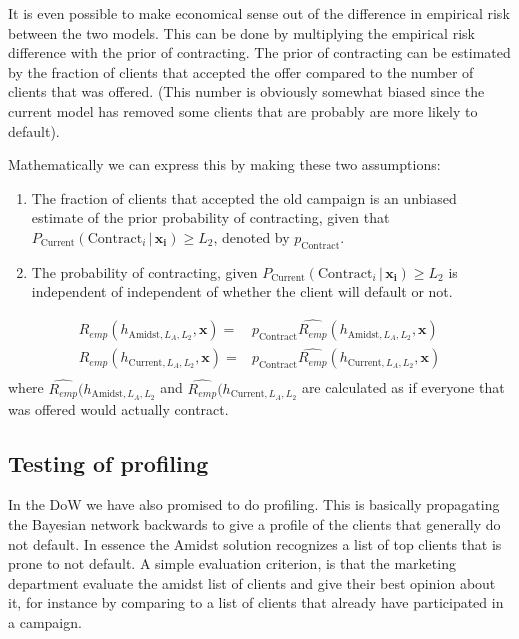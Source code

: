 \documentclass{article}
\theoremstyle{theorem}
\theoremstyle{definition}
\newcommand{\bv}[1]{\bm{#1}}
\begin{document}
It is even possible to make economical sense out of the difference in empirical risk between the two models.  This can be done by multiplying the empirical risk difference with the prior of contracting.  The prior of contracting can be estimated by the fraction of clients that accepted the offer compared to the number of clients that was offered.  (This number is obviously somewhat biased since the current model has removed some clients that are probably are more likely to default).

Mathematically we can express this by making these two assumptions:

\begin{enumerate}
\item The fraction of clients that accepted the old campaign is an unbiased estimate of the prior probability of contracting, given that $P_{\mbox{Current}}(\mbox{Contract}_i \,|\, \bv{x_i}) \geq L_2$, denoted by $p_{\mbox{Contract} }$.
\item The probability of contracting, given $P_{\mbox{Current}}(\mbox{Contract}_i \,|\, \bv{x_i}) \geq L_2$ is independent of independent of whether the client will default or not.
\end{enumerate}

\begin{equation}
\begin{split}
R_{emp}(h_{\mbox{Amidst},L_A,L_2}, \bv{x}) =& p_{\mbox{Contract}} \widehat{R_{emp}}(h_{\mbox{Amidst},L_A,L_2}, \bv{x})\\
R_{emp}(h_{\mbox{Current},L_A,L_2}, \bv{x}) =& p_{\mbox{Contract}} \widehat{R_{emp}}(h_{\mbox{Current},L_A,L_2}, \bv{x})\\
\end{split}
\end{equation}
where $\widehat{R_{emp}}(h_{\mbox{Amidst},L_A,L_2}$ and $\widehat{R_{emp}}(h_{\mbox{Current},L_A,L_2}$ are calculated as if everyone that was offered would actually contract.

\subsection*{Testing of profiling}

In the DoW we have also promised to do profiling. This is basically propagating the Bayesian network backwards to give a profile of the clients that generally do not default. In essence the Amidst solution recognizes a list of top clients that is prone to not default.  A simple evaluation criterion, is that the marketing department evaluate the amidst list of clients and give their best opinion about it, for instance by comparing to a list of clients that already have participated in a campaign.
\end{document}

